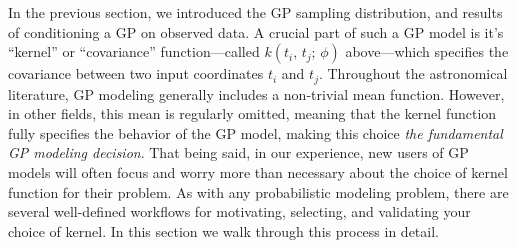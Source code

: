 \documentclass[letterpaper]{ar-1col}
\begin{document}



In the previous section, we introduced the GP sampling distribution, and results of conditioning a GP on observed data.
A crucial part of such a GP model is it's ``kernel'' or ``covariance'' function---called $k(t_i,\,t_j;\,\phi)$ above---which specifies the covariance between two input coordinates $t_i$ and $t_j$.
Throughout the astronomical literature, GP modeling generally includes a non-trivial mean function.
However, in other fields, this mean is regularly omitted, meaning that the kernel function fully specifies the behavior of the GP model, making this choice \emph{the fundamental GP modeling decision}.
That being said, in our experience, new users of GP models will often focus and worry more than necessary about the choice of kernel function for their problem.
As with any probabilistic modeling problem, there are several well-defined workflows for motivating, selecting, and validating your choice of kernel.
In this section we walk through this process in detail.



\end{document}
